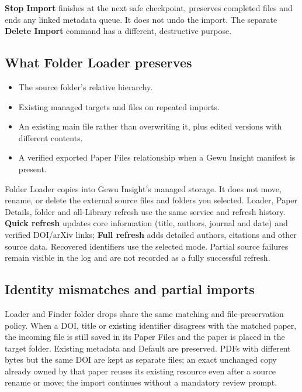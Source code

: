 \documentclass[10pt,letterpaper,oneside]{scrreprt}
\providecommand{\tightlist}{\setlength{\itemsep}{1pt}\setlength{\parskip}{0pt}}
\begin{document}
\textbf{Stop Import} finishes at the next safe checkpoint, preserves completed files and ends any linked metadata queue. It does not undo the import. The separate \textbf{Delete Import} command has a different, destructive purpose.

\subsection{What Folder Loader preserves}\label{what-folder-loader-preserves}

\begin{itemize}
\tightlist
\item
  The source folder's relative hierarchy.
\item
  Existing managed targets and files on repeated imports.
\item
  An existing main file rather than overwriting it, plus edited versions with different contents.
\item
  A verified exported Paper Files relationship when a Gewu Insight manifest is present.
\end{itemize}

Folder Loader copies into Gewu Insight's managed storage. It does not move, rename, or delete the external source files and folders you selected. Loader, Paper Details, folder and all-Library refresh use the same service and refresh history. \textbf{Quick refresh} updates core information (title, authors, journal and date) and verified DOI/arXiv links; \textbf{Full refresh} adds detailed authors, citations and other source data. Recovered identifiers use the selected mode. Partial source failures remain visible in the log and are not recorded as a fully successful refresh.

\subsection{Identity mismatches and partial imports}\label{identity-mismatches-and-partial-imports}

Loader and Finder folder drops share the same matching and file-preservation policy. When a DOI, title or existing identifier disagrees with the matched paper, the incoming file is still saved in its Paper Files and the paper is placed in the target folder. Existing metadata and Default are preserved. PDFs with different bytes but the same DOI are kept as separate files; an exact unchanged copy already owned by that paper reuses its existing resource even after a source rename or move; the import continues without a mandatory review prompt.
\end{document}
